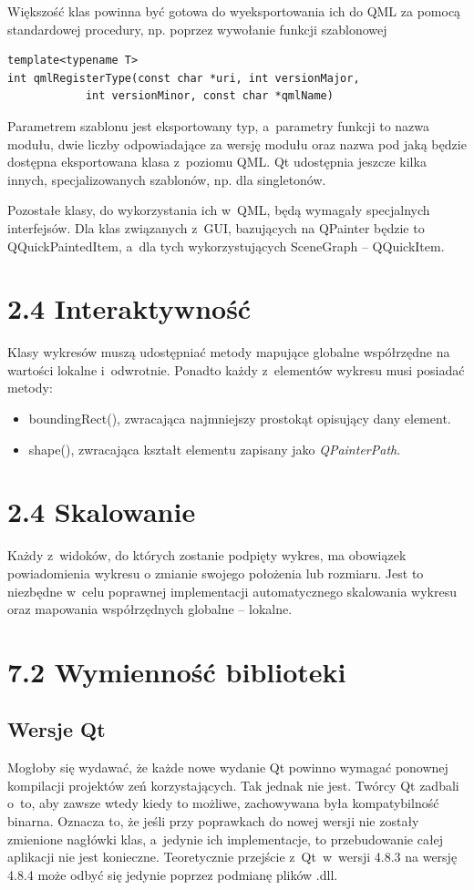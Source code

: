 Większość klas powinna być gotowa do wyeksportowania ich do QML za pomocą standardowej procedury, np. poprzez wywołanie funkcji szablonowej
\begin{lstlisting}
template<typename T>
int qmlRegisterType(const char *uri, int versionMajor, 
		    int versionMinor, const char *qmlName)
\end{lstlisting}
Parametrem szablonu jest eksportowany typ, a~parametry funkcji to nazwa modułu, dwie liczby odpowiadające za wersję modułu oraz nazwa pod jaką będzie dostępna eksportowana klasa z~poziomu QML. Qt udostępnia jeszcze kilka innych, specjalizowanych szablonów, np. dla singletonów.\newline

Pozostałe klasy, do wykorzystania ich w~QML, będą wymagały specjalnych interfejsów. Dla klas związanych z~GUI, bazujących na QPainter będzie to QQuickPaintedItem, a~dla tych wykorzystujących SceneGraph -- QQuickItem.


\section{2.4 Interaktywność}
Klasy wykresów muszą udostępniać metody mapujące globalne współrzędne na wartości lokalne i~odwrotnie. Ponadto każdy z~elementów wykresu musi posiadać metody:
\begin{itemize}
\item{boundingRect(), zwracająca najmniejszy prostokąt opisujący dany element.}
\item{shape(), zwracająca kształt elementu zapisany jako \textit{QPainterPath}.}
\end{itemize}

\section{2.4 Skalowanie}
Każdy z~widoków, do których zostanie podpięty wykres, ma obowiązek powiadomienia wykresu o zmianie swojego położenia lub rozmiaru. Jest to niezbędne w~celu poprawnej implementacji automatycznego skalowania wykresu oraz mapowania współrzędnych globalne -- lokalne.


\section{7.2 Wymienność biblioteki}
\subsection{Wersje Qt}
Mogłoby się wydawać, że każde nowe wydanie Qt powinno wymagać ponownej kompilacji projektów zeń korzystających. Tak jednak nie jest. Twórcy Qt zadbali o~to, aby zawsze wtedy kiedy to możliwe, zachowywana była kompatybilność binarna. Oznacza to, że jeśli przy poprawkach do nowej wersji nie zostały zmienione nagłówki klas, a~jedynie ich implementacje, to przebudowanie całej aplikacji nie jest konieczne. Teoretycznie przejście z~Qt~w~wersji 4.8.3 na wersję 4.8.4 może odbyć się jedynie poprzez podmianę plików .dll.

